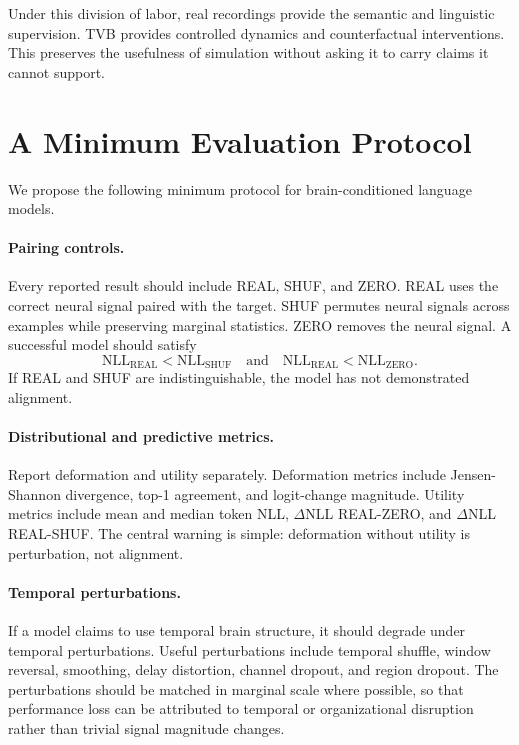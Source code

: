 \documentclass{article}
\begin{document}
Under this division of labor, real recordings provide the semantic and linguistic supervision.
TVB provides controlled dynamics and counterfactual interventions.
This preserves the usefulness of simulation without asking it to carry claims it cannot support.

\section{A Minimum Evaluation Protocol}

We propose the following minimum protocol for brain-conditioned language models.

\paragraph{Pairing controls.}
Every reported result should include REAL, SHUF, and ZERO.
REAL uses the correct neural signal paired with the target.
SHUF permutes neural signals across examples while preserving marginal statistics.
ZERO removes the neural signal.
A successful model should satisfy
\[
\mathrm{NLL}_{\mathrm{REAL}} < \mathrm{NLL}_{\mathrm{SHUF}}
\quad\text{and}\quad
\mathrm{NLL}_{\mathrm{REAL}} < \mathrm{NLL}_{\mathrm{ZERO}}.
\]
If REAL and SHUF are indistinguishable, the model has not demonstrated alignment.

\paragraph{Distributional and predictive metrics.}
Report deformation and utility separately.
Deformation metrics include Jensen-Shannon divergence, top-1 agreement, and logit-change magnitude.
Utility metrics include mean and median token NLL, $\Delta$NLL REAL-ZERO, and $\Delta$NLL REAL-SHUF.
The central warning is simple: deformation without utility is perturbation, not alignment.

\paragraph{Temporal perturbations.}
If a model claims to use temporal brain structure, it should degrade under temporal perturbations.
Useful perturbations include temporal shuffle, window reversal, smoothing, delay distortion, channel dropout, and region dropout.
The perturbations should be matched in marginal scale where possible, so that performance loss can be attributed to temporal or organizational disruption rather than trivial signal magnitude changes.
\end{document}
